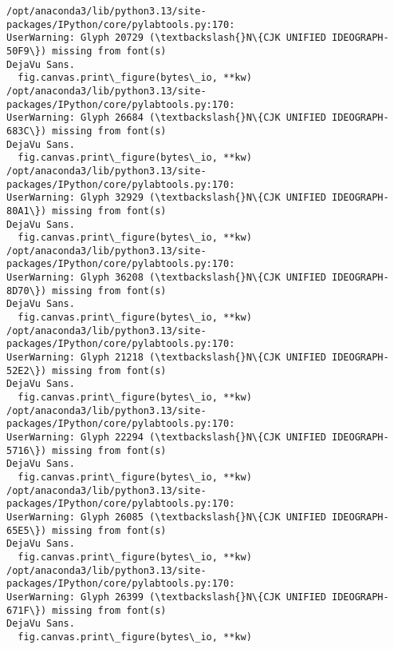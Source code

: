\documentclass[11pt]{article}
\begin{document}
    \begin{Verbatim}[commandchars=\\\{\}]
/opt/anaconda3/lib/python3.13/site-packages/IPython/core/pylabtools.py:170:
UserWarning: Glyph 20729 (\textbackslash{}N\{CJK UNIFIED IDEOGRAPH-50F9\}) missing from font(s)
DejaVu Sans.
  fig.canvas.print\_figure(bytes\_io, **kw)
/opt/anaconda3/lib/python3.13/site-packages/IPython/core/pylabtools.py:170:
UserWarning: Glyph 26684 (\textbackslash{}N\{CJK UNIFIED IDEOGRAPH-683C\}) missing from font(s)
DejaVu Sans.
  fig.canvas.print\_figure(bytes\_io, **kw)
/opt/anaconda3/lib/python3.13/site-packages/IPython/core/pylabtools.py:170:
UserWarning: Glyph 32929 (\textbackslash{}N\{CJK UNIFIED IDEOGRAPH-80A1\}) missing from font(s)
DejaVu Sans.
  fig.canvas.print\_figure(bytes\_io, **kw)
/opt/anaconda3/lib/python3.13/site-packages/IPython/core/pylabtools.py:170:
UserWarning: Glyph 36208 (\textbackslash{}N\{CJK UNIFIED IDEOGRAPH-8D70\}) missing from font(s)
DejaVu Sans.
  fig.canvas.print\_figure(bytes\_io, **kw)
/opt/anaconda3/lib/python3.13/site-packages/IPython/core/pylabtools.py:170:
UserWarning: Glyph 21218 (\textbackslash{}N\{CJK UNIFIED IDEOGRAPH-52E2\}) missing from font(s)
DejaVu Sans.
  fig.canvas.print\_figure(bytes\_io, **kw)
/opt/anaconda3/lib/python3.13/site-packages/IPython/core/pylabtools.py:170:
UserWarning: Glyph 22294 (\textbackslash{}N\{CJK UNIFIED IDEOGRAPH-5716\}) missing from font(s)
DejaVu Sans.
  fig.canvas.print\_figure(bytes\_io, **kw)
/opt/anaconda3/lib/python3.13/site-packages/IPython/core/pylabtools.py:170:
UserWarning: Glyph 26085 (\textbackslash{}N\{CJK UNIFIED IDEOGRAPH-65E5\}) missing from font(s)
DejaVu Sans.
  fig.canvas.print\_figure(bytes\_io, **kw)
/opt/anaconda3/lib/python3.13/site-packages/IPython/core/pylabtools.py:170:
UserWarning: Glyph 26399 (\textbackslash{}N\{CJK UNIFIED IDEOGRAPH-671F\}) missing from font(s)
DejaVu Sans.
  fig.canvas.print\_figure(bytes\_io, **kw)
    \end{Verbatim}

    \begin{center}
    \end{center}
    { \hspace*{\fill} \\}
    
\end{document}
